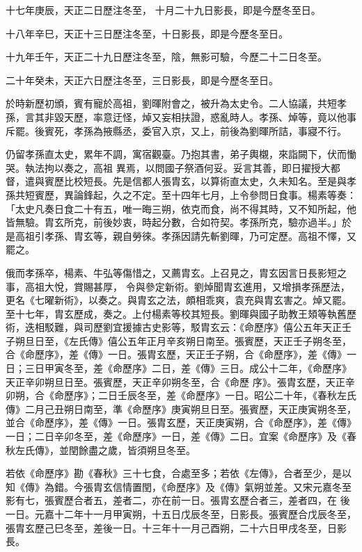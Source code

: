 \begin{pinyinscope}
 十七年庚辰，天正二日歷注冬至，
 十月二十九日影長，即是今歷冬至日。



 十八年辛巳，天正十三日歷注冬至，十日影長，即是今歷冬至日。



 十九年壬午，天正二十九日歷注冬至，陰，無影可驗，今歷二十二日冬至。



 二十年癸未，天正六日歷注冬至，三日影長，即是今歷冬至日。



 於時新歷初頒，賓有寵於高祖，劉暉附會之，被升為太史令。二人協議，共短孝孫，言其非毀天歷，率意迂怪，焯又妄相扶證，惑亂時人。孝孫、焯等，竟以他事斥罷。後賓死，孝孫為掖縣丞，委官入京，又上，前後為劉暉所詰，事寢不行。



 仍留孝孫直太史，累年不調，寓宿觀臺。乃抱其書，弟子輿櫬，來詣闕下，伏而慟哭。執法拘以奏之，高祖
 異焉，以問國子祭酒何妥。妥言其善，即日擢授大都督，遣與賓歷比校短長。先是信都人張胄玄，以算術直太史，久未知名。至是與孝孫共短賓歷，異論鋒起，久之不定。至十四年七月，上令參問日食事。楊素等奏：「太史凡奏日食二十有五，唯一晦三朔，依克而食，尚不得其時，又不知所起，他皆無驗。胄玄所克，前後妙衷，時起分數，合如符契。孝孫所克，驗亦過半。」於是高祖引孝孫、胄玄等，親自勞徠。孝孫因請先斬劉暉，乃可定歷。高祖不懌，又罷之。



 俄而孝孫卒，楊素、牛弘等傷惜之，又薦胄玄。上召見之，胄玄因言日長影短之事，高祖大悅，賞賜甚厚，
 令與參定新術。劉焯聞胄玄進用，又增損孝孫歷法，更名《七曜新術》，以奏之。與胄玄之法，頗相乖爽，袁充與胄玄害之。焯又罷。至十七年，胄玄歷成，奏之。上付楊素等校其短長。劉暉與國子助教王頍等執舊歷術，迭相駁難，與司歷劉宜援據古史影等，駁胄玄云：《命歷序》僖公五年天正壬子朔旦日至，《左氏傳》僖公五年正月辛亥朔日南至。張賓歷，天正壬子朔冬至，合《命歷序》，差《傳》一日。張胄玄歷，天正壬子朔，合《命歷序》，差《傳》一日；三日甲寅冬至，差《命歷序》二日，差《傳》三日。成公十二年，《命歷序》天正辛卯朔旦日至。張賓歷，天正辛卯朔冬至，合《命歷
 序》。張胄玄歷，天正辛卯朔，合《命歷序》；二日壬辰冬至，差《命歷序》一日。昭公二十年，《春秋左氏傳》二月己丑朔日南至，準《命歷序》庚寅朔旦日至。張賓歷，天正庚寅朔冬至，並合《命歷序》，差《傳》一日。張胄玄歷，天正庚寅朔，合《命歷序》，差《傳》一日；二日辛卯冬至，差《命歷序》一日，差《傳》二日。宜案《命歷序》及《春秋左氏傳》，並閏餘盡之歲，皆須朔旦冬至。



 若依《命歷序》勘《春秋》三十七食，合處至多；若依《左傳》，合者至少，是以知《傳》為錯。今張胄玄信情置閏，《命歷序》及《傳》氣朔並差。又宋元嘉冬至影有七，張賓歷合者五，差者二，亦在前一日。張胄玄歷合者三，差者四，在
 後一日。元嘉十二年十一月甲寅朔，十五日戊辰冬至，日影長。張賓歷合戊辰冬至，張胄玄歷己巳冬至，差後一日。十三年十一月己酉朔，二十六日甲戌冬至，日影長。




\end{pinyinscope}
